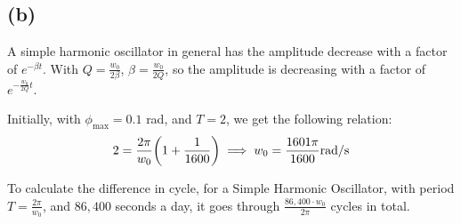 \documentclass{article}
\DeclarePairedDelimiter{\paran}{(}{)}%
\begin{document}
\subsection*{(b)}
A simple harmonic oscillator in general has the amplitude decrease with a factor of $e^{-\beta t}$. With $Q=\frac{w_0}{2\beta}$, $\beta = \frac{w_0}{2Q}$, so the amplitude is decreasing with a factor of $e^{-\frac{w_0}{2Q}t}$.

Initially, with $\phi_{\max}=0.1$ rad, and $T=2$, we get the following relation:
\begin{equation}
    2 =  \frac{2\pi}{w_0}\paran*{1+\frac{1}{1600}}\implies w_0 = \frac{1601\pi}{1600}\textmd{rad/s}
\end{equation}

\hfil

To calculate the difference in cycle, for a Simple Harmonic Oscillator, with period $T=\frac{2\pi}{w_0}$, and $86,400$ seconds a day, it goes through $\frac{86,400 \cdot w_0}{2\pi}$ cycles in total.
\end{document}
